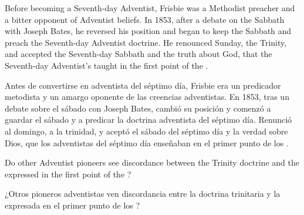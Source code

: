 Before becoming a Seventh-day Adventist, Frisbie was a Methodist preacher and a bitter opponent of Adventist beliefs. In 1853, after a debate on the Sabbath with Joseph Bates, he reversed his position and began to keep the Sabbath and preach the Seventh-day Adventist doctrine. He renounced Sunday, the Trinity, and accepted the Seventh-day Sabbath and the truth about God, that the Seventh-day Adventist’s taught in the first point of the .


Antes de convertirse en adventista del séptimo día, Frisbie era un predicador metodista y un amargo oponente de las creencias adventistas. En 1853, tras un debate sobre el sábado con Joseph Bates, cambió su posición y comenzó a guardar el sábado y a predicar la doctrina adventista del séptimo día. Renunció al domingo, a la trinidad, y aceptó el sábado del séptimo día y la verdad sobre Dios, que los adventistas del séptimo día enseñaban en el primer punto de los .


Do other Adventist pioneers see discordance between the Trinity doctrine and the  expressed in the first point of the ?


¿Otros pioneros adventistas ven discordancia entre la doctrina trinitaria y la  expresada en el primer punto de los ?






